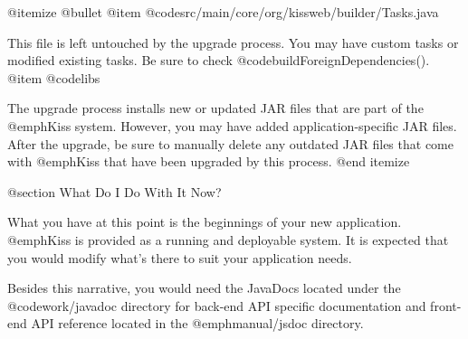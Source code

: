 @itemize @bullet
@item
@code{src/main/core/org/kissweb/builder/Tasks.java}

This file is left untouched by the upgrade process.  You may have
custom tasks or modified existing tasks.  Be sure to check
@code{buildForeignDependencies()}.
@item
@code{libs}

The upgrade process installs new or updated JAR files that are part of
the @emph{Kiss} system.  However, you may have added
application-specific JAR files.  After the upgrade, be sure to manually delete any
outdated JAR files that come with @emph{Kiss} that have been upgraded
by this process.
@end itemize


@section What Do I Do With It Now?

What you have at this point is the beginnings of your new application.
@emph{Kiss} is provided as a running and deployable system.  It is
expected that you would modify what's there to suit your application
needs.

Besides this narrative, you would need the JavaDocs located under the
@code{work/javadoc} directory for back-end API specific documentation and
front-end API reference located in the @emph{manual/jsdoc} directory.
